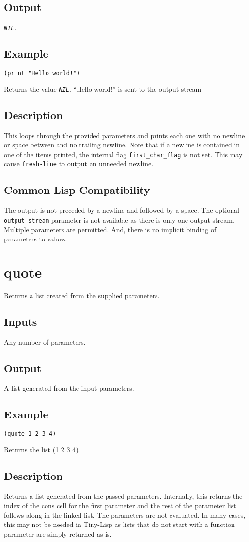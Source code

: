 \documentclass[10pt, openany]{book}
\newcommand{\constant}[1]{\emph{\texttt{#1}}}
\newcommand{\keyword}[1]{\texttt{#1}}
\newcommand{\tl}{Tiny-Lisp}
\begin{document}
\subsection{Output}
\constant{NIL}.
\subsection{Example}
\begin{lstlisting}
(print "Hello world!")
\end{lstlisting}
Returns the value \constant{NIL}.  ``Hello world!'' is sent to the output stream.
\subsection{Description}
This loops through the provided parameters and prints each one with no newline or space between and no trailing newline.  Note that if a newline is contained in one of the items printed, the internal flag \keyword{first\_char\_flag} is not set.  This may cause \keyword{fresh-line} to output an unneeded newline.
\subsection{Common Lisp Compatibility}
The output is not preceded by a newline and followed by a space.  The optional \keyword{output-stream} parameter is not available as there is only one output stream.  Multiple parameters are permitted.  And, there is no implicit binding of parameters to values.

\section{quote}
Returns a list created from the supplied parameters.
\subsection{Inputs}
Any number of parameters.
\subsection{Output}
A list generated from the input parameters.
\subsection{Example}
\begin{lstlisting}
(quote 1 2 3 4)
\end{lstlisting}
Returns the list (1 2 3 4).
\subsection{Description}
Returns a list generated from the passed parameters.  Internally, this returns the index of the cons cell for the first parameter and the rest of the parameter list follows along in the linked list.  The parameters are not evaluated.  In many cases, this may not be needed in \tl{} as lists that do not start with a function parameter are simply returned as-is.
\end{document}
